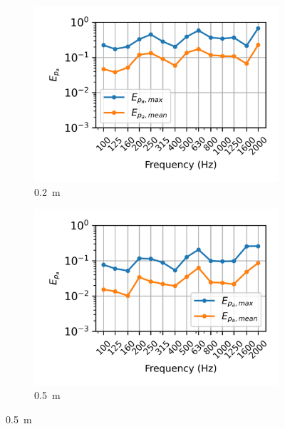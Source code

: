 {\begin{figure}
	\centering
	\begin{subfigure}[b]{0.48\textwidth}
		\centering
		\includegraphics{fig/chap4/simulation_domain/width_0pt2m.png}
		\caption{\SI{0.2}{\meter}}
	\end{subfigure}
	\hfill
	\begin{subfigure}[b]{0.48\textwidth}
		\centering
		\includegraphics{fig/chap4/simulation_domain/width_0pt5m.png}
		\caption{\SI{0.5}{\meter}}
	\end{subfigure}
	

\end{figure}}
